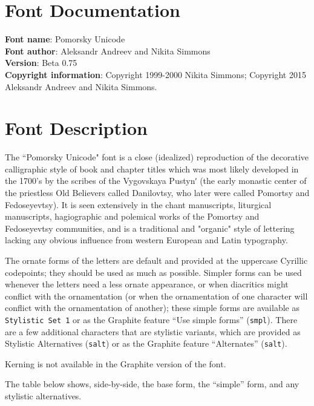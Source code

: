 \documentclass{article}
\begin{document}
\tabulinesep=1.2mm
\section{Font Documentation} 

 \textbf{Font name}: Pomorsky Unicode \\
\textbf{Font author}: Aleksandr Andreev and Nikita Simmons \\
\textbf{Version}: Beta 0.75 \\
\textbf{Copyright information}: Copyright 1999-2000 Nikita Simmons; Copyright 2015 Aleksandr Andreev and Nikita Simmons. \\

\section{Font Description}

The ``Pomorsky Unicode" font is a close (idealized) reproduction of the decorative calligraphic style of book and chapter titles which was most likely developed in the 1700's by the scribes of the Vygovskaya Pustynʹ (the early monastic center of the priestless Old Believers called Danilovtsy, who later were called Pomortsy and Fedoseyevtsy). It is seen extensively in the chant manuscripts, liturgical manuscripts, hagiographic and polemical works of the Pomortsy and Fedoseyevtsy communities, and is a traditional and "organic" style of lettering lacking any obvious influence from western European and Latin typography.

The ornate forms of the letters are default and provided at the uppercase Cyrillic codepoints; they should be used as much as possible. Simpler forms can be used whenever the letters need a less ornate appearance, or when diacritics might conflict with the ornamentation (or when the ornamentation of one character will conflict with the ornamentation of another); these simple forms are available as \verb+Stylistic Set 1+ or as the Graphite feature ``Use simple forms'' (\verb+smpl+). There are a few additional characters that are stylistic variants, which are provided as Stylistic Alternatives (\verb+salt+) or as the Graphite feature ``Alternates'' (\verb+salt+).

Kerning is not available in the Graphite version of the font.

The table below shows, side-by-side, the base form, the ``simple'' form, and any stylistic alternatives.
\end{document}
